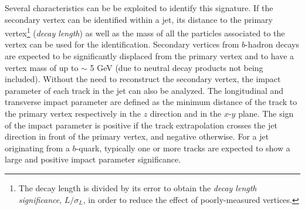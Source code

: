 Several characteristics can be be exploited to identify this signature. 
If the secondary vertex can be identified within a jet, its distance to the primary vertex\footnote{The decay length is divided by its error to obtain the \textit{decay length significance}, $L/\sigma_L$, in order to reduce the effect of poorly-measured vertices.} (\textit{decay length}) as well as the mass of all the particles associated to the vertex can be used for the identification. Secondary vertices from $b$-hadron decays are expected to be significantly displaced from the primary vertex and to have a vertex mass of up to $\sim$ 5 GeV (due to neutral decay products not being included).
Without the need to reconstruct the secondary vertex, the impact parameter of each track in the jet can also be analyzed. The longitudinal and transverse impact parameter are defined as the minimum distance of the track to the primary vertex respectively in the $z$ direction and in the $x$-$y$ plane. 
The sign of the impact parameter is positive if the track extrapolation crosses the jet direction in front of the primary vertex, and negative otherwise.
For a jet originating from a $b$-quark, typically one or more tracks are expected to show a large and positive impact parameter significance.

